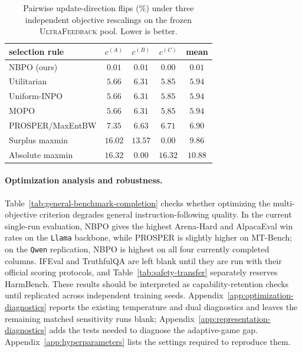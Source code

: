 \documentclass{article}
\theoremstyle{remark}
\theoremstyle{plain}
\newcommand{\NBPO}{\textsc{NBPO}}
\begin{document}
\begin{table}[htbp]
\centering\footnotesize
\setlength{\tabcolsep}{4.0pt}
\caption{Pairwise update-direction flips (\%) under three independent objective rescalings on the frozen \textsc{UltraFeedback} pool. Lower is better.}
\label{tab:uf-scale-covariance}
\begin{tabular}{lcccc}
\toprule
selection rule & $c^{(A)}$ & $c^{(B)}$ & $c^{(C)}$ & mean\\
\midrule
\NBPO{} (ours) & $\mathbf{0.01}$ & $\mathbf{0.01}$ & $\mathbf{0.00}$ & $\mathbf{0.01}$\\
Utilitarian & $5.66$ & $6.31$ & $5.85$ & $5.94$\\
Uniform-INPO & $5.66$ & $6.31$ & $5.85$ & $5.94$\\
MOPO & $5.66$ & $6.31$ & $5.85$ & $5.94$\\
PROSPER/MaxEntBW & $7.35$ & $6.63$ & $6.71$ & $6.90$\\
Surplus maxmin & $16.02$ & $13.57$ & $0.00$ & $9.86$\\
Absolute maxmin & $16.32$ & $0.00$ & $16.32$ & $10.88$\\
\bottomrule
\end{tabular}
\end{table}

\paragraph{Optimization analysis and robustness.}
Table~\ref{tab:general-benchmark-completion} checks whether optimizing the multi-objective criterion degrades general instruction-following quality. In the current single-run evaluation, \NBPO{} gives the highest Arena-Hard and AlpacaEval win rates on the \texttt{Llama} backbone, while PROSPER is slightly higher on MT-Bench; on the \texttt{Qwen} replication, \NBPO{} is highest on all four currently completed columns. IFEval and TruthfulQA are left blank until they are run with their official scoring protocols, and Table~\ref{tab:safety-transfer} separately reserves HarmBench. These results should be interpreted as capability-retention checks until replicated across independent training seeds. Appendix~\ref{app:optimization-diagnostics} reports the existing temperature and dual diagnostics and leaves the remaining matched sensitivity runs blank; Appendix~\ref{app:representation-diagnostics} adds the tests needed to diagnose the adaptive-game gap. Appendix~\ref{app:hyperparameters} lists the settings required to reproduce them.
\end{document}
